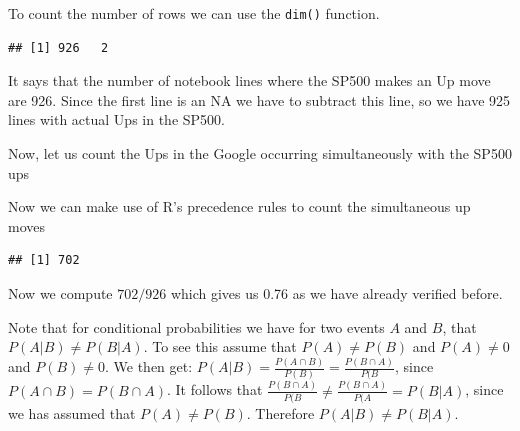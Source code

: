 \documentclass[
]{book}
\newenvironment{Shaded}{\begin{snugshade}}{\end{snugshade}}
\newcommand{\AttributeTok}[1]{\textcolor[rgb]{0.77,0.63,0.00}{#1}}
\newcommand{\ConstantTok}[1]{\textcolor[rgb]{0.00,0.00,0.00}{#1}}
\newcommand{\FunctionTok}[1]{\textcolor[rgb]{0.00,0.00,0.00}{#1}}
\newcommand{\NormalTok}[1]{#1}
\newcommand{\OtherTok}[1]{\textcolor[rgb]{0.56,0.35,0.01}{#1}}
\newcommand{\SpecialCharTok}[1]{\textcolor[rgb]{0.00,0.00,0.00}{#1}}
\begin{document}
To count the number of rows we can use the \texttt{dim()} function.

\begin{Shaded}
\end{Shaded}

\begin{verbatim}
## [1] 926   2
\end{verbatim}

It says that the number of notebook lines where the SP500 makes an Up move are 926. Since the
first line is an NA we have to subtract this line, so we have 925 lines with actual Ups in the
SP500.

Now, let us count the Ups in the Google occurring simultaneously with the SP500 ups

\begin{Shaded}
\end{Shaded}

Now we can make use of R's precedence rules to count the simultaneous up moves

\begin{Shaded}
\end{Shaded}

\begin{verbatim}
## [1] 702
\end{verbatim}

Now we compute \(702/926\) which gives us 0.76 as we have already verified before.

Note that for conditional probabilities we have for two events \(A\) and \(B\), that
\(P(A|B) \neq P(B|A)\). To see this assume that \(P(A) \neq P(B)\) and \(P(A) \neq 0\) and
\(P(B)\neq 0\). We then get:
\(P(A|B) = \frac{P(A\cap B)}{P(B)} = \frac{P(B \cap A)}{P(B}\), since \(P(A \cap B) = P(B \cap A)\).
It follows that \(\frac{P(B \cap A)}{P(B} \neq \frac{P(B \cap A)}{P(A} = P(B|A)\), since we
has assumed that \(P(A) \neq P(B)\). Therefore \(P(A|B) \neq P(B|A)\).
\end{document}
